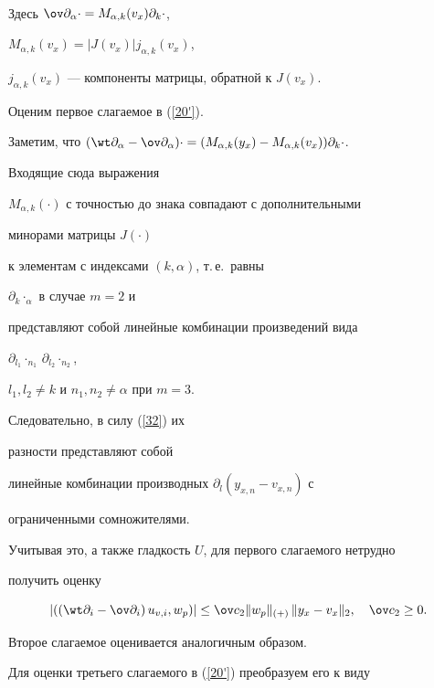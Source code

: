 {\begin{multline}
\end{multline}


Здесь $\ov \partial_{\alpha}\cdot=


M_{\alpha,k}(v_x)\partial_{k}\cdot$,


$M_{\alpha,k}(v_x)=|J(v_x)| j_{\alpha,k}(v_x)$,


$j_{\alpha,k}(v_x)$ --- компоненты матрицы, обратной к $J(v_x)$. 





Оценим первое слагаемое в (\ref{20'}).


Заметим, что $(\wt\partial_{\alpha}- \ov \partial_{\alpha})\cdot= 


(M_{\alpha,k}(y_x)-M_{\alpha,k}(v_x))\partial_{k}\cdot$.


Входящие сюда выражения 


$M_{\alpha,k}(\cdot)$ с точностью до знака совпадают с дополнительными 


минорами матрицы $J(\cdot)$


к элементам с индексами $(k,\alpha)$, т.\,е.~равны


$\partial_{k} \cdot_\alpha$ в случае $m=2$ и 


представляют собой линейные комбинации произведений вида


$\partial_{l_1}{}\cdot_{n_1}\,  \partial_{l_2}{}\cdot_{n_2}$,


$l_1,l_2\neq k$ и $n_1,n_2\neq \alpha$ при $m=3$.


Следовательно, в силу (\ref{32}) их


разности представляют собой


линейные комбинации производных $\partial_{l} (y_{x,n}-v_{x,n})$ с 


ограниченными сомножителями. 


Учитывая это, а также гладкость $U$, для первого слагаемого нетрудно 


получить оценку


$$


\left|{\Scal{\left(\wt\partial_i-\ov\partial_{i}\right)u_{v,i},w_p}}\right|


\leq \ov c_2 \|w_p\|_{(+)}\, \|y_x-v_x\|_2,\quad \ov c_2\ge 0.


$$


Второе слагаемое оценивается аналогичным образом.


Для оценки третьего слагаемого в (\ref{20'}) преобразуем его к виду


\begin{multline*}



\end{multline*}}
